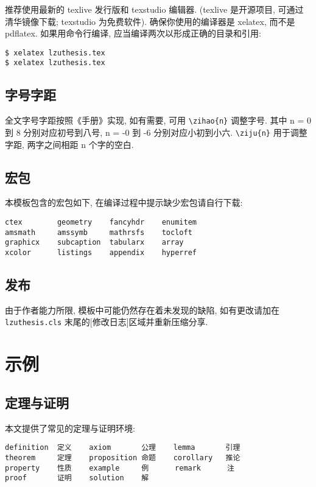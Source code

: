 \documentclass{lzuthesis}
\begin{document}
推荐使用最新的 texlive 发行版和 texstudio 编辑器.
(texlive 是开源项目, 可通过清华镜像下载; texstudio 为免费软件).
确保你使用的编译器是 xelatex, 而不是 pdflatex. 如果用命令行编译,
应当编译两次以形成正确的目录和引用:

\begin{verbatim}
$ xelatex lzuthesis.tex
$ xelatex lzuthesis.tex
\end{verbatim}

\subsection{字号字距}

全文字号字距按照《手册》实现, 如有需要, 可用 \verb|\zihao{n}| 调整字号. 其中 n = 0 到 8 分别对应初号到八号, n = -0 到 -6 分别对应小初到小六. \verb|\ziju{n}| 用于调整字距, 两字之间相距 n 个字的空白.

\subsection{宏包}

本模板包含的宏包如下, 在编译过程中提示缺少宏包请自行下载:

\begin{verbatim}
ctex        geometry    fancyhdr    enumitem
amsmath     amssymb     mathrsfs    tocloft
graphicx    subcaption  tabularx    array
xcolor      listings    appendix    hyperref
\end{verbatim}

\subsection{发布}

由于作者能力所限, 模板中可能仍然存在着未发现的缺陷, 如有更改请加在
\texttt{lzuthesis.cls} 末尾的[修改日志]区域并重新压缩分享. 

\section{示例}

\subsection{定理与证明}

本文提供了常见的定理与证明环境:

\begin{verbatim}
definition  定义    axiom       公理    lemma       引理
theorem     定理    proposition 命题    corollary   推论
property    性质    example     例      remark      注
proof       证明    solution    解
\end{verbatim}
\end{document}

